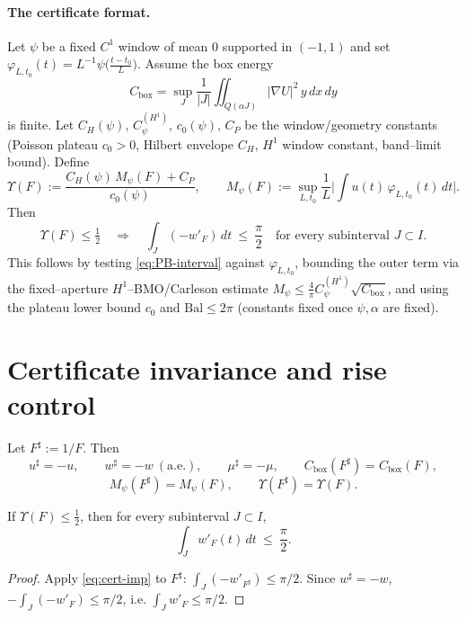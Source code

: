 \paragraph{The certificate format.}
Let $\psi$ be a fixed $C^1$ window of mean $0$ supported in $(-1,1)$ and set $\varphi_{L,t_0}(t)=L^{-1}\psi\big(\frac{t-t_0}{L}\big)$. Assume the box energy
\[
C_{\mathrm{box}}=\sup_{J}\frac{1}{|J|}\iint_{Q(\alpha J)}|\nabla U|^2\,y\,dx\,dy
\]
is finite. Let $C_H(\psi),\,C_\psi^{(H^1)},\,c_0(\psi),\,C_P$ be the window/geometry constants (Poisson plateau $c_0>0$, Hilbert envelope $C_H$, $H^1$ window constant, band–limit bound). Define
\[
\Upsilon(F):=\frac{C_H(\psi)\,M_\psi(F)+C_P}{c_0(\psi)},\qquad
M_\psi(F):=\sup_{L,t_0}\frac{1}{L}\Big|\int u(t)\,\varphi_{L,t_0}(t)\,dt\Big|.
\]
Then
\begin{equation}\label{eq:cert-imp}
\Upsilon(F)\le \tfrac{1}{2}\quad\Longrightarrow\quad
\int_{J}(-w'_F)\,dt\ \le\ \frac{\pi}{2}\quad\text{for every subinterval }J\subset I.
\end{equation}
This follows by testing \eqref{eq:PB-interval} against $\varphi_{L,t_0}$, bounding the outer term via the fixed–aperture $H^1$–BMO/Carleson estimate
$M_\psi\le \tfrac{4}{\pi}C_\psi^{(H^1)}\sqrt{C_{\mathrm{box}}}$, and using the plateau lower bound $c_0$ and $\mathrm{Bal}\le 2\pi$ (constants fixed once $\psi,\alpha$ are fixed).

\section*{Certificate invariance and rise control}

\begin{lemma}\label{lem:inv-wedge}
Let $F^\sharp:=1/F$. Then
\[
u^\sharp=-u,\qquad w^\sharp=-w\ (\text{a.e.}),\qquad \mu^\sharp=-\mu,\qquad C_{\mathrm{box}}(F^\sharp)=C_{\mathrm{box}}(F),
\]
\[M_\psi(F^\sharp)=M_\psi(F),\qquad \Upsilon(F^\sharp)=\Upsilon(F).\]
\end{lemma}

\begin{lemma}\label{lem:rise-wedge}
If $\Upsilon(F)\le \tfrac12$, then for every subinterval $J\subset I$,
\[\int_{J} w'_F(t)\,dt\ \le\ \frac{\pi}{2}.\]
\end{lemma}

\begin{proof}
Apply \eqref{eq:cert-imp} to $F^\sharp$: $\int_J (-w'_{F^\sharp})\le \pi/2$. Since $w^\sharp=-w$, $-\int_J (-w'_F)\le \pi/2$, i.e. $\int_J w'_F\le \pi/2$.
\end{proof}

